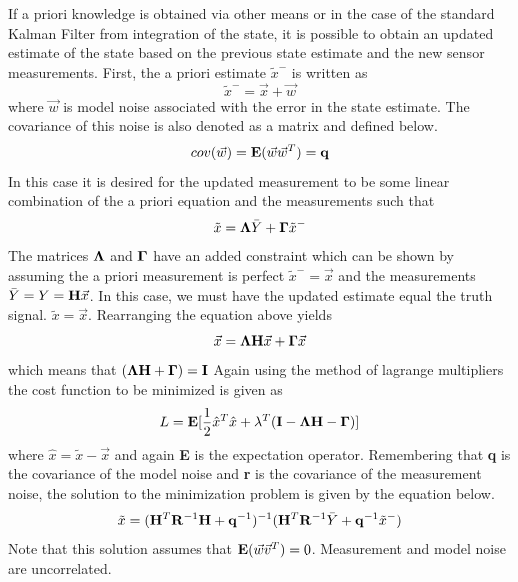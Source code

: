If a priori knowledge is obtained via other means or in the case of
the standard Kalman Filter from integration of the state, it is
possible to obtain an updated estimate of the state based on the
previous state estimate and the new sensor measurements. First, the a
priori estimate $\tilde{x}^{-}$ is written as 
\begin{equation}
  \tilde{x}^{-} = \vec{x} +  \vec{w}
\end{equation}
where $\vec{w}$ is model noise associated with the error in the
state estimate. The covariance of this noise is also denoted as a
matrix and defined below.
\begin{equation}
  cov(\vec{w}) = {\bf E}(\vec{w}\vec{w}^T) = {\bf q}
\end{equation}
In this case it is desired for the updated measurement to be some
linear combination of the a priori equation and the measurements such
that
\begin{equation}
  \tilde{x} = {\bf \Lambda}\bar{Y} + {\bf \Gamma}\tilde{x}^{-}
\end{equation}
The matrices ${\bf \Lambda}$ and ${\bf \Gamma}$ have an added constraint
which can be shown by assuming the a priori measurement is perfect
$\tilde{x}^- = \vec{x}$ and the measurements $\bar{Y} = Y = {\bf
  H}\vec{x}$. In this case, we must have the updated estimate equal
the truth signal. $\tilde{x} = \vec{x}$. Rearranging the equation above yields
\begin{equation}
  \vec{x} = {\bf \Lambda}{\bf H}\vec{x} + {\bf \Gamma}\vec{x}
\end{equation}
which means that $({\bf \Lambda}{\bf H} + {\bf \Gamma}) = {\bf I}$
Again using the method of lagrange multipliers the cost function to be
minimized is given as
\begin{equation}
  L = {\bf E}[\frac{1}{2}\hat{x}^T\hat{x} + \lambda^T({\bf I} - {\bf
    \Lambda}{\bf H} - {\bf \Gamma})]
\end{equation}
where $\hat{x} = \tilde{x} - \vec{x}$ and again {\bf E} is the
expectation operator. Remembering that {\bf q} is
the covariance of the model noise and {\bf r} is the covariance of the
measurement noise, the solution to the minimization problem is given
by the equation below. 
\begin{equation}
  \tilde{x} = ({\bf H}^T{\bf R}^{-1}{\bf H}+{\bf q}^{-1})^{-1}({\bf
    H}^T{\bf R}^{-1}\bar{Y}+{\bf q}^{-1}\tilde{x}^{-})
\end{equation}
Note that this solution assumes that ${\bf E}(\vec{w}\vec{v}^T) = 0$. Measurement and model noise are uncorrelated.

